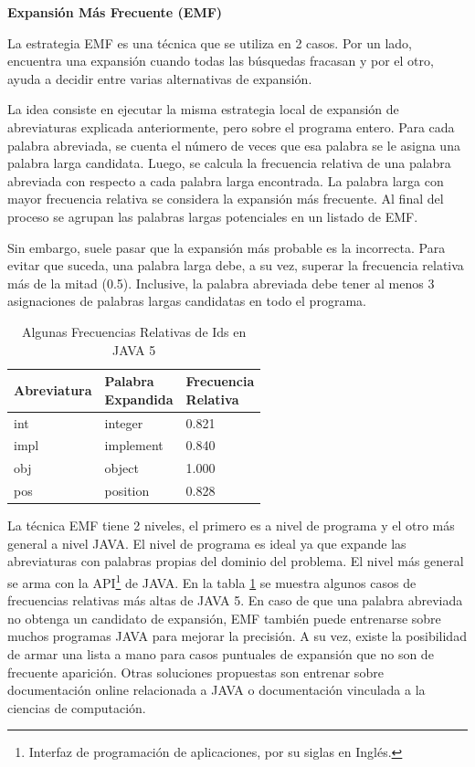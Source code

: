 \noindent \textbf{Expansión Más Frecuente (EMF)\\}


La estrategia EMF \cite{EZH08} es una técnica que se utiliza en 2 casos. Por un lado, 
encuentra una expansión cuando todas las búsquedas fracasan y por el otro, ayuda a decidir entre varias alternativas de expansión. 

La idea consiste en ejecutar la misma estrategia local de expansión de abreviaturas explicada anteriormente, pero sobre el programa entero. Para cada palabra abreviada, se cuenta el número de veces que esa palabra se le asigna una palabra larga candidata. Luego, se calcula la frecuencia relativa de una palabra abreviada con respecto a cada palabra larga encontrada. La palabra larga con mayor frecuencia relativa se considera la expansión más frecuente. Al final del proceso se agrupan las palabras largas potenciales en un listado de EMF.

Sin embargo, suele pasar que la expansión más probable es la incorrecta. Para evitar que suceda, una palabra larga debe, a su vez, superar la frecuencia relativa más de la mitad (0.5). Inclusive, la palabra abreviada debe tener al menos 3 asignaciones de palabras largas candidatas en todo el programa.

\begin{table}[b!]
\centering
   \begin{tabular}{| l |l | l |}
     \hline \textbf{Abreviatura} & \shortstack{\textbf{Palabra} \\ \textbf{Expandida}} & \shortstack{\textbf{Frecuencia} \\ \textbf{Relativa}} \\
     \hline int & integer & 0.821 \\
     \hline impl & implement & 0.840 \\
     \hline obj & object & 1.000 \\
     \hline pos & position & 0.828 \\
     \hline	   
   \end{tabular}
   
\caption{Algunas Frecuencias Relativas de Ids en JAVA 5}
\label{tabEmf}
 
\end {table}

La técnica EMF tiene 2 niveles, el primero es a nivel de programa y el otro más general a nivel JAVA. El nivel de programa es ideal ya que expande las abreviaturas con palabras propias del dominio del problema. El nivel más general se arma con la API\footnote[1]{Interfaz de programación de aplicaciones, por su siglas en Inglés.} de JAVA. En la tabla \ref{tabEmf} se muestra algunos casos de frecuencias relativas más altas de JAVA 5. En caso de que una palabra abreviada no obtenga un candidato de expansión, EMF también puede entrenarse sobre muchos programas JAVA para mejorar la precisión. A su vez, existe la posibilidad de armar una lista a mano para casos puntuales de expansión que no son de frecuente aparición. Otras soluciones propuestas son entrenar sobre documentación online relacionada a JAVA o documentación vinculada a la ciencias de computación.



